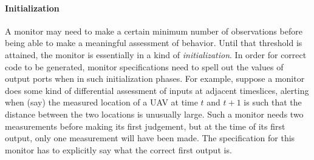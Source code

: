 \paragraph{Initialization}
A monitor may need to make a certain minimum number of observations before being able to make a meaningful assessment of behavior. Until that threshold is attained, the monitor is essentially in a kind of \emph{initialization}. In order for correct code to be generated, monitor specifications need to spell out the values of output ports when in such initialization phases. For example, suppose a monitor does some kind of differential assessment of inputs at adjacent timeslices, alerting when (say) the measured location of a UAV at time $t$ and $t+1$ is such that the distance between the two locations is unusually large. Such a monitor needs two measurements before making its first judgement, but at the time of its first output, only one measurement will have been made. The specification for this monitor has to explicitly say what the correct first output is.


